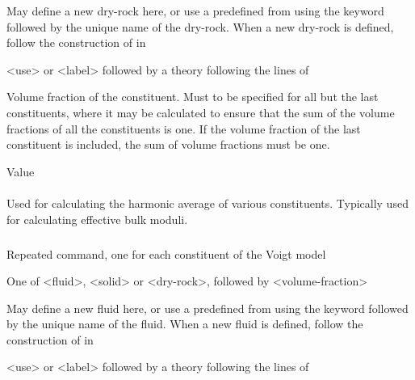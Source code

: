 {
 \slist
   \item \Description  May define a new dry-rock here, or use a predefined  from  using the keyword  followed by the unique name of the dry-rock. When a new dry-rock is defined, follow the construction of  in 
   \item \Argument <use> or <label> followed by a theory following the lines of 
   \item \Default
 \elist

 \slist
   \item \Description Volume fraction of the constituent. Must to be specified for all but the last constituents, where it may be calculated to ensure that the sum of the volume fractions of all the constituents is one. If the volume fraction of the last constituent is included, the sum of volume fractions must be one. 
   \item \Argument Value
   \item \Default
 \elist

\paragraph{}
 \slist
   \item \Description Used for calculating the harmonic average of various constituents. Typically used for calculating effective bulk moduli. 
   \item \Argument
   \item \Default 
 \elist

\subparagraph{}
 \slist
   \item \Description Repeated command, one for each constituent of the Voigt model
   \item \Argument One of <fluid>, <solid> or <dry-rock>, followed by <volume-fraction>
   \item \Default
 \elist

 \slist
   \item \Description May define a new fluid here, or use a predefined  from  using the keyword  followed by the unique name of the fluid. When a new fluid is defined, follow the construction of  in 
   \item \Argument <use> or <label> followed by a theory following the lines of 
   \item \Default
 \elist

}
